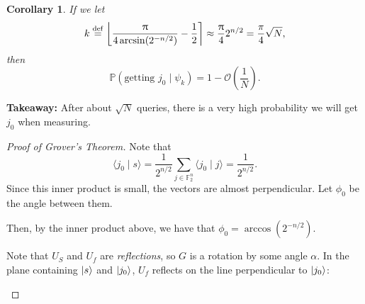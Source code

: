 \documentclass[12pt]{amsart}
\theoremstyle{plain}
\newtheorem{corollary}[theorem]{Corollary}
\theoremstyle{definition}
\theoremstyle{remark}
\newcommand{\mcal}{\mathcal}
\newcommand{\F}{\mathbb{F}}
\newcommand{\mpi}{\uppi}
\newcommand{\idef}{\overset{{\rm def}}{=}}
\newcommand{\prob}{\mathbb{P}}
\begin{document}
\begin{corollary}
  If we let
  \[
    k \idef \left\lfloor \frac{\mpi}{4 \arcsin(2^{-n/2})} - \frac{1}{2} \right\rceil \approx \frac{\mpi}{4} 2^{n/2} = \frac{\pi}{4} \sqrt{N},
  \]
  then
  \[
    \prob(\text{getting $j_0$} \mid \psi_k) = 1 - \mcal{O}\left( \frac{1}{N} \right).
  \]
\end{corollary}

\textbf{Takeaway:}  After about $\sqrt{N}$ queries, there is a very high probability we will get $j_0$ when measuring.

\begin{proof}[Proof of Grover's Theorem]
  Note that
  \[
    \langle j_0 \mid s \rangle = \frac{1}{2^{n/2}} \sum_{j \in \F_2^n} \langle j_0 \mid j \rangle = \frac{1}{2^{n/2}}.
  \]
  Since this inner product is small, the vectors are almost perpendicular.  Let $\phi_0$ be the angle between them.

  \begin{center}
  \end{center}
  Then, by the inner product above, we have that $\phi_0 = \arccos(2^{-n/2})$.


  Note that $U_S$ and $U_f$ are \emph{reflections}, so $G$ is a rotation by some angle  $\alpha$.  In the plane containing $\ket{s}$ and $\ket{j_0}$, $U_f$ reflects on the line perpendicular to $\ket{j_0}$:

  \begin{center}
\end{center}
\end{proof}
\end{document}
